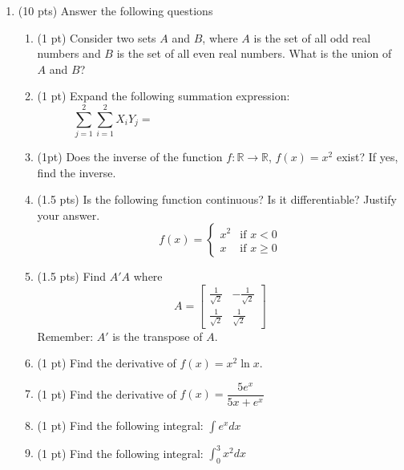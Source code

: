 \documentclass{./../../../Latex/tests}
\begin{document}
\thispagestyle{plain}
\vspace{0.5em}

\begin{enumerate}	

\item (10 pts) Answer the following questions
\begin{enumerate}
\item (1 pt) Consider two sets $A$ and $B$, where $A$ is the set of all odd real numbers and $B$ is the set of all even real numbers. What is the union of $A$ and $B$? 
\vspace{3cm}
\item (1 pt) Expand the following summation expression: $$\sum_{j=1}^2  \sum_{i=1}^2 X_i Y_j = \hspace{8cm}$$
 \vspace{1cm}
\item (1pt) Does the inverse of the function $f: \mathbb{R} \rightarrow \mathbb{R}$, $f(x)=x^2$ exist? If yes, find the inverse.
\vspace{3cm}
\item (1.5 pts) Is the following function continuous? Is it differentiable? Justify your answer.
$$ f(x) = 
    \begin{cases} 
    x^2 & \text{if } x < 0 \\
    x & \text{if } x \geq 0 
    \end{cases} $$
\vspace{3cm}
\newpage
\item (1.5 pts) Find $A'A$ where $$ A=\begin{bmatrix}
	\frac{1}{\sqrt{2}} & -\frac{1}{\sqrt{2}} \\ \frac{1}{\sqrt{2}} & \frac{1}{\sqrt{2}}
\end{bmatrix} $$
Remember: $A'$ is the transpose of $A$.
\vspace{6cm}

\item (1 pt) Find the derivative of $ f(x) = x^2 \ln x $.
\vspace{3cm}
\item (1 pt) Find the derivative of $f(x) = \dfrac{5e^x}{5x+e^x}$
  \vspace{3cm}
  \item (1 pt) Find the following integral: $ \int e^x dx $
    \vspace{2.5cm}
\item (1 pt) Find the following integral: $ \int_0^3 x^2 dx $


\end{enumerate}
\end{enumerate}
\end{document}

